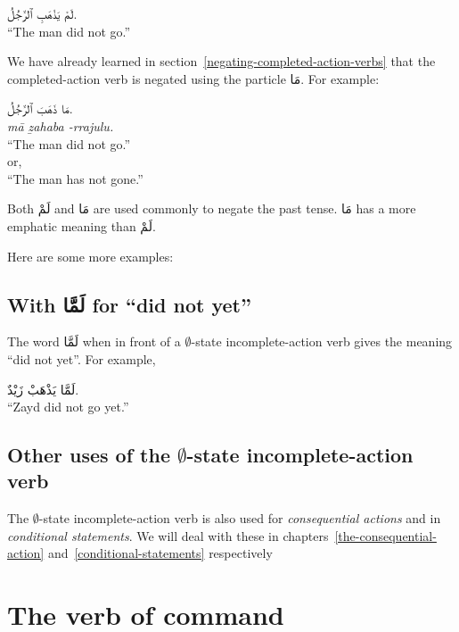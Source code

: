 \documentclass[
  10pt,
]{book}
\begin{document}
\foreignlanguage{arabic}{لَمْ يَذْهَبِ ٱلرَّجُلُ.}\\
\enquote{The man did not go.}

We have already learned in
section~\ref{negating-completed-action-verbs} that the completed-action verb is negated using the particle \foreignlanguage{arabic}{مَا}. For example:

\foreignlanguage{arabic}{مَا ذَهَبَ ٱلرَّجُلُ.}\\
\emph{mā ẕahaba -rrajulu.}\\
\enquote{The man did not go.}\\
or,\\
\enquote{The man has not gone.}

Both \foreignlanguage{arabic}{لَمْ} and \foreignlanguage{arabic}{مَا} are used commonly to negate the past tense.
\foreignlanguage{arabic}{مَا} has a more emphatic meaning than \foreignlanguage{arabic}{لَمْ}.

Here are some more examples:

\subsection{\texorpdfstring{With \foreignlanguage{arabic}{لَمَّا} for \enquote{did not yet}}{With لَمَّا for ``did not yet''}}\label{with-ux644ux645ux627-for-did-not-yet}

The word \foreignlanguage{arabic}{لَمَّا} when in front of a
\(\emptyset\)-state
incomplete-action verb
gives the meaning \enquote{did not yet}.
For example,

\foreignlanguage{arabic}{لَمَّا يَذْهَبْ زَيْدٌ.}\\
\enquote{Zayd did not go yet.}

\subsection{\texorpdfstring{Other uses of the \(\emptyset\)-state incomplete-action verb}{Other uses of the \textbackslash emptyset-state incomplete-action verb}}\label{other-uses-of-the-emptyset-state-incomplete-action-verb}

The \(\emptyset\)-state incomplete-action verb is also used for \emph{consequential actions} and in \emph{conditional statements}. We will deal with these in
chapters~\ref{the-consequential-action}
and~\ref{conditional-statements}
respectively

\section{The verb of command}\label{the-verb-of-command}
\end{document}
